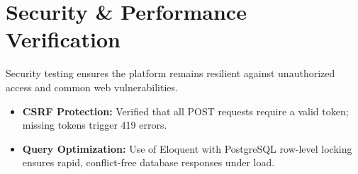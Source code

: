 \section{Security \& Performance Verification}
Security testing ensures the platform remains resilient against unauthorized access and common web vulnerabilities.
\begin{itemize}
    \item \textbf{CSRF Protection:} Verified that all POST requests require a valid token; missing tokens trigger 419 errors.
    \item \textbf{Query Optimization:} Use of Eloquent with PostgreSQL row-level locking ensures rapid, conflict-free database responses under load.
\end{itemize}

